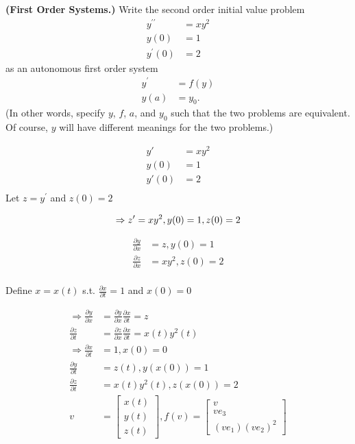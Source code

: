 \textbf{(First Order Systems.)} Write the second order initial value
problem
\begin{align}
y^{\prime\prime} &= xy^2 \\
y(0) &= 1 \\
y^\prime(0) &= 2
\end{align}
as an autonomous first order system
\begin{align}
  y^\prime &= f(y)\\
y(a) &= y_0.
\end{align}
(In other words, specify $y$, $f$, $a$, and $y_0$ such that the two
problems are equivalent. Of course, $y$ will have different meanings
for the two problems.)


{\color{blue}

\begin{align*}
y'&=xy^2\\
y(0)&=1\\
y'(0)&=2\\
\end{align*}
Let $z=y^\prime$ and $z(0)=2$

\[
\Rightarrow z^\prime=xy^2, y(0)=1, z(0)=2\\
\]

\begin{align*}
\frac{\partial y}{\partial x}&=z, y(0)=1\\
\frac{\partial z}{\partial x}&=xy^2, z(0)=2\\
\end{align*}

Define $x=x(t)$ s.t. $\frac{\partial x}{\partial t}=1$
and $x(0)=0$

\begin{align*}
\Rightarrow \frac{\partial y}{\partial x}&=\frac{\partial y}{\partial x}\frac{\partial x}{\partial t}=z\\
\frac{\partial z}{\partial t}&=\frac{\partial z}{\partial x}\frac{\partial x}{\partial t}=x(t)y^2(t)\\
\Rightarrow \frac{\partial x}{\partial t}&=1, x(0)=0\\
\frac{\partial y}{\partial t}&=z(t), y(x(0))=1\\
\frac{\partial z}{\partial t}&=x(t)y^2(t), z(x(0))=2\\
v&=\begin{bmatrix}
x(t)\\
y(t)\\
z(t)
\end{bmatrix},
f(v)=\begin{bmatrix}
v\\
ve_3\\
(ve_1)(ve_2)^2
\end{bmatrix}\\
\end{align*}

}
